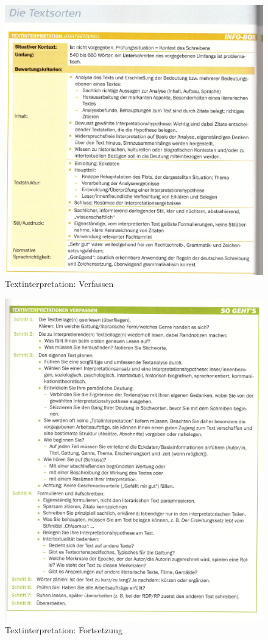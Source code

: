 \begin{figure}[h]
    \centering
    \includegraphics[scale=0.8]{./pics/Screenshot from 2023-02-06 12-31-28.png}
    \caption{Textinterpretation: Verfassen}
    \label{fig:impl:Textinterpretation2}
\end{figure}
\begin{figure}[h]
    \centering
    \includegraphics[scale=0.8]{./pics/Screenshot from 2023-02-06 12-32-23.png}
    \caption{Textinterpretation: Fortsetzung}
    \label{fig:impl:Textinterpretation3}
\end{figure}
